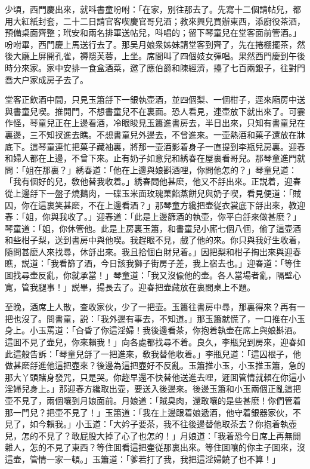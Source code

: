 少頃，西門慶出來，就呌書童吩咐：「在家，别往那去了。先寫十二個請帖兒，都用大紅紙封套，二十二日請官客喫慶官哥兒酒；教來興兒買辦東西，添廚役茶酒，預備桌面齊整；玳安和兩名排軍送帖兒，呌唱的；留下琴童兒在堂客面前管酒。」吩咐畢，西門慶上馬送行去了。那吴月娘衆姊妹請堂客到齊了，先在捲棚擺茶，然後大廳上屏開孔雀，褥隱芙蓉，上坐。席間叫了四個妓女彈唱。果然西門慶到午後時分來家。家中安排一食盒酒菜，邀了應伯爵和陳經濟，擡了七百兩銀子，往對門喬大户家成房子去了。

堂客正飲酒中間，只見玉簫㧱下一銀執壶酒，並四個梨、一個柑子，逕來廂房中送與書童兒喫。推開門，不想書童兒不在裏面。恐人看見，連壶放下就出來了。可霎作怪，琴童兒正在上邊看酒，冷眼睃見玉簫進書房去，半日出來，只知有書童兒在裏邊，三不知扠進去瞧。不想書童兒外邊去，不曾進來。一壶熱酒和菓子還放在牀底下。這琴童連忙把菓子藏袖裏，將那一壶酒影着身子一直提到李瓶兒房裏。迎春和婦人都在上邊，不曾下來。止有奶子如意兒和綉春在屋裏看哥兒。那琴童進門就問：「姐在那裏？」綉春道：「他在上邊與娘斟酒哩，你問他怎的？」琴童兒道：「我有個好的兒，敎他替我收着。」綉春問他甚麽，他又不㧱出來。正説着，迎春從上邊㧱下一盤子燒鵝肉，一碟玉米面玫瑰菓餡蒸餅兒與奶子喫，看見便道：「賊囚，你在這裏笑甚麽，不在上邊看酒？」那琴童方纔把壶従衣裳底下㧱出來，教迎春：「姐，你與我收了。」迎春道：「此是上邊篩酒的執壶，你平白㧱來做甚麽？」琴童道：「姐，你休管他。此是上房裏玉簫，和書童兒小廝七個八個，偷了這壶酒和些柑子梨，送到書房中與他喫。我趕眼不見，戲了他的來。你只與我好生收着，隨問甚麽人來找尋，休㧱出來。我且拾個白財兒着。」因把梨和柑子掏出來與迎春瞧，説道：「我看篩了酒，今日該我獅子街房子差，我上宿去也。」迎春道：「等住囬找尋壶反亂，你就承當！」琴童道：「我又沒偸他的壶。各人當場者亂，隔壁心寬，管我腿事！」説畢，揚長去了。迎春把壶藏放在裏間桌上不題。

至晚，酒席上人散，查收家伙，少了一把壶。玉簫往書房中尋，那裏得來？再有一把也沒了。問書童，説：「我外邊有事去，不知道。」那玉簫就慌了，一口推在小玉身上。小玉罵道：「㒲昏了你這淫婦！我後邊看茶，你抱着執壶在席上與娘斟酒。這囬不見了壶兒，你來賴我！」向各處都找尋不着。良久，李瓶兒到房來，迎春如此這般告訴：「琴童兒㧱了一把進來，敎我替他收着。」李瓶兒道：「這囚根子，他做甚麽㧱進他這把壺來？後邊為這把壺好不反亂。玉簫推小玉，小玉推玉簫，急的那大丫頭賭身發咒，只是哭。你趂早還不快替他送進去哩，遲囬管情就賴在你這小淫婦兒身上。」那迎春方纔取出壶，要送入後邊來。後邊玉簫和小玉兩個正亂這把壶不見了，兩個嚷到月娘面前。月娘道：「賊臭肉，還敢嚷的是些甚麽！你們管着那一門兒？把壶不見了！」玉簫道：「我在上邊跟着娘遞酒，他守着銀器家伙，不見了，如今賴我。」小玉道：「大妗子要茶，我不往後邊替他取茶去？你抱着執壺兒，怎的不見了？敢屁股大掉了心了也怎的！」月娘道：「我着恐今日席上再無閒雜人，怎的不見了東西？等住囬看這把壷従那裏出來。等住囬嚷的你主子囬來，沒這壶，管情一家一頓。」玉簫道：「爹若打了我，我把這淫婦饒了也不算！」

